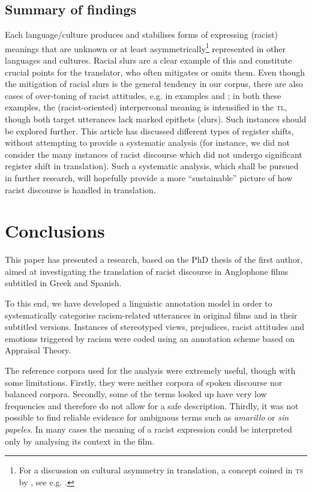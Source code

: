 \documentclass[output=paper]{LSP/langsci}
\begin{document}
\subsection{Summary of findings} \label{sec:2:5:2}
Each language/culture produces and stabilises forms of expressing (racist) meanings that are unknown or at least asymmetrically\footnote{For a discussion on cultural asymmetry in translation, a concept coined in \textsc{ts} by \citet{EvenZohar2005}, see e.g. \citet{Klaudy2012}.} represented in other languages and cultures. Racial slurs are a clear example of this and constitute crucial points for the translator, who often mitigates or omits them. Even though the mitigation of racial slurs is the general tendency in our corpus, there are also cases of over-toning of racist attitudes, e.g. in examples  and ; in both these examples, the (racist-oriented) interpersonal meaning is intensified in the \textsc{tl}, though both target utterances lack marked epithets (slurs). Such instances should be explored further. This article has discussed different types of register shifts, without attempting to provide a systematic analysis (for instance, we did not consider the many instances of racist discourse which did not undergo significant register shift in translation). Such a systematic analysis, which shall be pursued in further research, will hopefully provide a more “sustainable” picture of how racist discourse is handled in translation.

\section{Conclusions} \label{sec:2:6}

This paper has presented a research, based on the PhD thesis of the first author, aimed at investigating the translation of racist discourse in Anglophone films subtitled in Greek and Spanish.

To this end, we have developed a linguistic annotation model in order to systematically categorise racism-related utterances in original films and in their subtitled versions. Instances of stereotyped views, prejudices, racist attitudes and emotions triggered by racism were coded using an annotation scheme based on Appraisal Theory.

The reference corpora used for the analysis were extremely useful, though with some limitations. Firstly, they were neither corpora of spoken discourse nor balanced corpora. Secondly, some of the terms looked up have very low frequencies and therefore do not allow for a safe description. Thirdly, it was not possible to find reliable evidence for ambiguous terms such as \textit{amarillo} or \textit{sin papeles}. In many cases the meaning of a racist expression could be interpreted only by analysing its context in the film.
\end{document}
